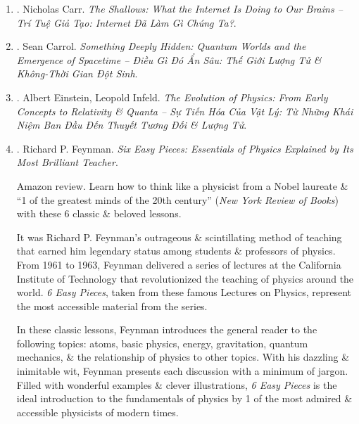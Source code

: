 \documentclass{article}
\begin{document}
\begin{enumerate}
    \item \cite{Carr_shallow_VN}. {\sc Nicholas Carr}. {\it The Shallows: What the Internet Is Doing to Our Brains -- Trí Tuệ Giả Tạo: Internet Đã Làm Gì Chúng Ta?}.\hfill{\sf[done]}

    \item \cite{Carroll_deep_hidden_VN}. {\sc Sean Carrol}. {\it Something Deeply Hidden: Quantum Worlds and the Emergence of Spacetime -- Điều Gì Đó Ẩn Sâu: Thế Giới Lượng Tử \& Không-Thời Gian Đột Sinh}.\hfill{\sf[done]}

	\item \cite{Einstein_Infeld_tien_hoa_Vat_Ly}. Albert Einstein, Leopold Infeld. {\it The Evolution of Physics: From Early Concepts to Relativity \& Quanta -- Sự Tiến Hóa Của Vật Lý: Từ Những Khái Niệm Ban Đầu Đến Thuyết Tương Đối \& Lượng Tử}.\hfill{\sf[done]}

	\item \cite{Feyman_Leighton_Sands_6_easy_pieces}. {\sc Richard P. Feynman}. {\it Six Easy Pieces: Essentials of Physics Explained by Its Most Brilliant Teacher}. {}

	{\sf Amazon review.} Learn how to think like a physicist from a Nobel laureate \& ``1 of the greatest minds of the 20th century'' ({\it New York Review of Books}) with these 6 classic \& beloved lessons.

	It was {\sc Richard P. Feynman}'s outrageous \& scintillating method of teaching that earned him legendary status among students \& professors of physics. From 1961 to 1963, {\sc Feynman} delivered a series of lectures at the California Institute of Technology that revolutionized the teaching of physics around the world. {\it6 Easy Pieces}, taken from these famous Lectures on Physics, represent the most accessible material from the series.

	In these classic lessons, {\sc Feynman} introduces the general reader to the following topics: atoms, basic physics, energy, gravitation, quantum mechanics, \& the relationship of physics to other topics. With his dazzling \& inimitable wit, {\sc Feynman} presents each discussion with a minimum of jargon. Filled with wonderful examples \& clever illustrations, {\it6 Easy Pieces} is the ideal introduction to the fundamentals of physics by 1 of the most admired \& accessible physicists of modern times.


\end{enumerate}
\end{document}
